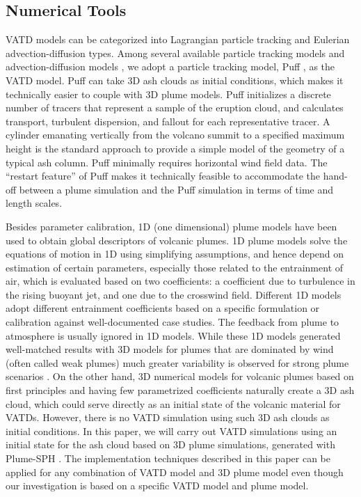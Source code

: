 \documentclass[draft,linenumbers]{agujournal2019}
\begin{document}
\subsection{Numerical Tools}
VATD models can be categorized into Lagrangian particle tracking and Eulerian advection-diffusion types.  Among several available particle tracking models \citep[e.g.][]{walko1995hypact, searcy1998puff, d1998modeling, draxler1998overview} and advection-diffusion models \citep[e.g.][]{bonadonna2005total, folch2009fall3d, schwaiger2012ash3d}, we adopt a particle tracking model, Puff \citep{tanaka1991development,searcy1998puff}, as the VATD model. Puff can take 3D ash clouds as initial conditions, which makes it technically easier to couple with 3D plume models. Puff initializes a discrete number of tracers that represent a sample of the eruption cloud, and calculates transport, turbulent dispersion, and fallout for each representative tracer.  A cylinder emanating vertically from the volcano summit to a specified maximum height is the standard approach to provide a simple model of the geometry of a typical ash column. Puff minimally requires horizontal wind field data. The ``restart feature'' of Puff makes it technically feasible to accommodate the hand-off between a plume simulation and the Puff simulation in terms of time and length scales.

Besides parameter calibration, 1D (one dimensional) plume models have been used to obtain global descriptors of volcanic plumes.  1D plume models \citep [e.g.][]{woods1988fluid, bursik2001effect, mastin2007user, de2015plume, folch2016fplume, pouget2016sensitivity} solve the equations of motion in 1D using simplifying assumptions, and hence depend on estimation of certain parameters, especially those related to the entrainment of air, which is evaluated based on two coefficients: a coefficient due to turbulence in the rising buoyant jet, and one due to the crosswind field. Different 1D models adopt different entrainment coefficients based on a specific formulation or calibration against well-documented case studies. The feedback from plume to atmosphere is usually ignored in 1D models. While these 1D models generated well-matched results with 3D models for plumes that are  dominated by wind (often called weak plumes) much greater variability is observed for strong plume scenarios \citep{costa2016results}. On the other hand, 3D numerical models for volcanic plumes based on first principles and having few parametrized coefficients \citep{oberhuber1998volcanic, neri2003multiparticle, suzuki2005numerical, cerminara2016ashee, cao2018plume} naturally create a 3D ash cloud, which could serve directly as an initial state of the volcanic material for VATDs. However, there is no VATD simulation using such 3D ash clouds as initial conditions. In this paper, we will carry out VATD simulations using an initial state for the ash cloud based on 3D plume simulations, generated with Plume-SPH \citep{cao2018plume,  cao2017data}.  The implementation techniques described in this paper can be applied for any combination of VATD model and 3D plume model even though our investigation is based on a specific VATD model and plume model.
\end{document}
